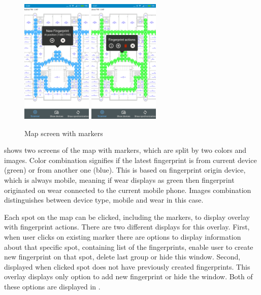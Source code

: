 \begin{figure}[h!]
	\begin{centering}
		\includegraphics[width=0.30\textwidth]{img/map_markers}
		\includegraphics[width=0.30\textwidth]{img/map_markers_own}
		\par\end{centering}
	\caption{Map screen with markers\label{fig:map_with_markers}}
	\label{fig04c05}
\end{figure}

 shows two screens of the map with markers, which are split by two colors and images. Color combination signifies if the latest fingerprint is from current device (green) or from another one (blue). This is based on fingerprint origin device, which is always mobile, meaning if wear displays as green then fingerprint originated on wear connected to the current mobile phone. Images combination distinguishes between device type, mobile and wear in this case.

Each spot on the map can be clicked, including the markers, to display overlay with fingerprint actions. There are two different displays for this overlay. First, when user clicks on existing marker there are options to display information about that specific spot, containing list of the fingerprints, enable user to create new fingerprint on that spot, delete last group or hide this window. Second, displayed when clicked spot does not have previously created fingerprints. This overlay displays only option to add new fingerprint or hide the window. Both of these options are displayed in .

